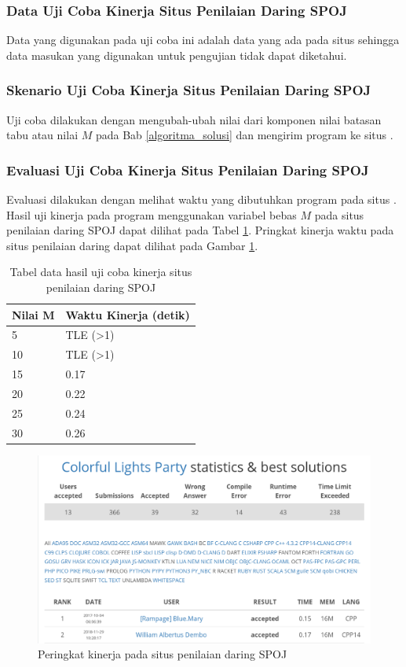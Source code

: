\subsubsection{Data Uji Coba Kinerja Situs Penilaian Daring SPOJ}
Data yang digunakan pada uji coba ini adalah data yang ada pada situs \problem\cite{PT07G} sehingga data masukan yang digunakan untuk pengujian tidak dapat diketahui.

\subsubsection{Skenario Uji Coba Kinerja Situs Penilaian Daring SPOJ}
Uji coba dilakukan dengan mengubah-ubah nilai dari komponen nilai batasan tabu atau nilai $ M $ pada Bab \ref{algoritma_solusi} dan mengirim program ke situs \problem\cite{PT07G}.

\subsubsection{Evaluasi Uji Coba Kinerja Situs Penilaian Daring SPOJ}
Evaluasi dilakukan dengan melihat waktu yang dibutuhkan program pada situs \problem\cite{PT07G}. Hasil uji kinerja pada program menggunakan variabel bebas $ M $ pada situs penilaian daring SPOJ dapat dilihat pada Tabel \ref{table:uji_coba_kinerja_spoj}. Pringkat kinerja waktu pada situs penilaian daring dapat dilihat pada Gambar \ref{fig:spoj_rank}.

\begin{table}[ht!]
	\centering
	\begin{tabularx}{0.6\textwidth}{|l|X|}
	\hline
	Nilai M						& Waktu Kinerja (detik) \\ \hline
	5							& TLE (>1) \\ \hline
	10							& TLE (>1) \\ \hline
	15							& 0.17 \\ \hline
	20							& 0.22 \\ \hline
	25							& 0.24 \\ \hline
	30							& 0.26 \\ \hline
	\end{tabularx}
	\caption{Tabel data hasil uji coba kinerja situs penilaian daring SPOJ}
	\label{table:uji_coba_kinerja_spoj}
\end{table}

\begin{figure}[ht!]
	\centering\includegraphics[width=\textwidth]{bab5/figures/spoj_rank.png}
	\caption{Peringkat kinerja pada situs penilaian daring SPOJ}
	\label{fig:spoj_rank}
\end{figure}